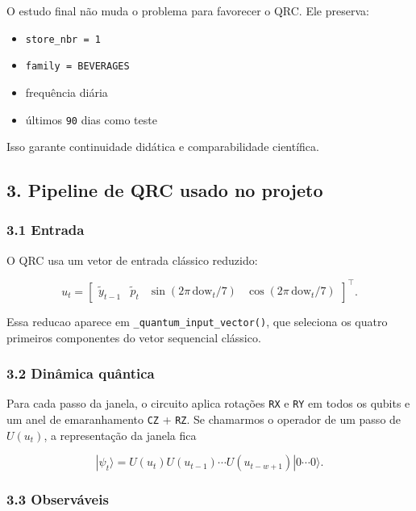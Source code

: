 \documentclass[12pt]{article}
\providecommand{\tightlist}{%
  \setlength{\itemsep}{0pt}\setlength{\parskip}{0pt}}
\begin{document}
O estudo final não muda o problema para favorecer o QRC. Ele preserva:

\begin{itemize}
\tightlist
\item
  \texttt{store\_nbr\ =\ 1}
\item
  \texttt{family\ =\ BEVERAGES}
\item
  frequência diária
\item
  últimos \texttt{90} dias como teste
\end{itemize}

Isso garante continuidade didática e comparabilidade científica.

\subsection{3. Pipeline de QRC usado no projeto}\label{3-pipeline-de-qrc-usado-no-projeto}

\subsubsection{3.1 Entrada}\label{31-entrada}

O QRC usa um vetor de entrada clássico reduzido:

\[
u_t =
\begin{bmatrix}
\widetilde{y}_{t-1} &
\widetilde{p}_t &
\sin(2\pi \, \mathrm{dow}_t / 7) &
\cos(2\pi \, \mathrm{dow}_t / 7)
\end{bmatrix}^\top.
\]

Essa reducao aparece em \texttt{\_quantum\_input\_vector()}, que seleciona os quatro primeiros componentes do vetor sequencial clássico.

\subsubsection{3.2 Dinâmica quântica}\label{32-dinuxe2mica-quuxe2ntica}

Para cada passo da janela, o circuito aplica rotações \texttt{RX} e \texttt{RY} em todos os qubits e um anel de emaranhamento \texttt{CZ} + \texttt{RZ}. Se chamarmos o operador de um passo de \(U(u_t)\), a representação da janela fica

\[
|\psi_t\rangle = U(u_t) U(u_{t-1}) \cdots U(u_{t-w+1}) |0 \cdots 0\rangle.
\]

\subsubsection{3.3 Observáveis}\label{33-observuxe1veis}
\end{document}
